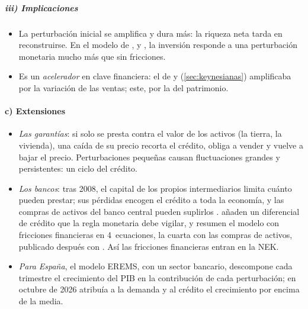 \documentclass[11pt]{article}
\begin{document}
\begin{infografia}[H]
\centering
\caption{El acelerador financiero: la espiral entre el ciclo financiero y el real}\label{figu:acelerador-financiero}
\end{infografia}

\subparagraph{iii) Implicaciones}

\begin{itemize}
\item La perturbación inicial se amplifica y dura más: la riqueza neta tarda en reconstruirse. En el modelo de ,  y , la inversión responde a una perturbación monetaria mucho más que sin fricciones.
\item Es un \emph{acelerador} en clave financiera: el de  y  (\ref{sec:keynesianas}) amplificaba por la variación de las ventas; este, por la del patrimonio.
\end{itemize}

\paragraph{c) Extensiones}

\begin{itemize}
\item \emph{Las garantías}\nocite{KiyotakiMoore1997Credit}: si solo se presta contra el valor de los activos (la tierra, la vivienda), una caída de su precio recorta el crédito, obliga a vender y vuelve a bajar el precio. Perturbaciones pequeñas causan fluctuaciones grandes y persistentes: un ciclo del crédito.
\item \emph{Los bancos}: tras 2008, el capital de los propios intermediarios limita cuánto pueden prestar; sus pérdidas encogen el crédito a toda la economía, y las compras de activos del banco central pueden suplirlos\nocite{GertlerKiyotaki2010Financial,GertlerKaradi2011Unconventional,SimsWuZhang2023Four} . \textcite{CurdiaWoodford2010Credit} añaden un diferencial de crédito que la regla monetaria debe vigilar, y \textcite{SimsWu2019Four} resumen el modelo con fricciones financieras en 4~ecuaciones, la cuarta con las compras de activos, publicado después con \nocite{SimsWuZhang2023}. Así las fricciones financieras entran en la NEK.
\item \emph{Para España}, el modelo EREMS, con un sector bancario, descompone cada trimestre el crecimiento del PIB en la contribución de cada perturbación; en octubre de 2026 atribuía a la demanda y al crédito el crecimiento por encima de la media\nocite{BoscaEtAl2026Observatorio}.
\end{itemize}
\end{document}
